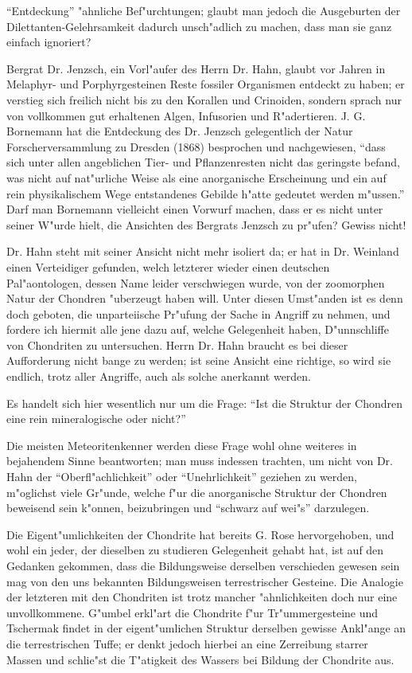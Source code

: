 \documentclass[a4paper, 12pt, oneside]{article}
\begin{document}
"`Entdeckung"' "ahnliche Bef"urchtungen; glaubt man jedoch die Ausgeburten der Dilettanten-Gelehrsamkeit dadurch unsch"adlich zu machen, dass man sie ganz einfach ignoriert?

Bergrat Dr. Jenzsch, ein Vorl"aufer des Herrn Dr. Hahn, glaubt vor Jahren in Melaphyr- und Porphyrgesteinen Reste fossiler Organismen entdeckt zu haben; er verstieg sich freilich nicht bis zu den Korallen und Crinoiden, sondern sprach nur von vollkommen gut erhaltenen Algen, Infusorien und R"adertieren. J. G. Bornemann hat die Entdeckung des Dr. Jenzsch gelegentlich der Natur Forscherversammlung zu Dresden (1868) besprochen und nachgewiesen, "`dass sich unter allen angeblichen Tier- und Pflanzenresten nicht das geringste befand, was nicht auf nat"urliche Weise als eine anorganische Erscheinung und ein auf rein physikalischem Wege entstandenes Gebilde h"atte gedeutet werden m"ussen."' Darf man Bornemann vielleicht einen Vorwurf machen, dass er es nicht unter seiner W"urde hielt, die Ansichten des Bergrats Jenzsch zu pr"ufen? Gewiss nicht!

Dr. Hahn steht mit seiner Ansicht nicht mehr isoliert da; er hat in Dr. Weinland einen Verteidiger gefunden, welch letzterer wieder einen deutschen Pal"aontologen, dessen Name leider verschwiegen wurde, von der zoomorphen Natur der Chondren "uberzeugt haben will. Unter diesen Umst"anden ist es denn doch geboten, die unparteiische Pr"ufung der Sache in Angriff zu nehmen, und fordere ich hiermit alle jene dazu auf, welche Gelegenheit haben, D"unnschliffe von Chondriten zu untersuchen. Herrn Dr. Hahn braucht es bei dieser Aufforderung nicht bange zu werden; ist seine Ansicht eine richtige, so wird sie endlich, trotz aller Angriffe, auch als solche anerkannt werden.

Es handelt sich hier wesentlich nur um die Frage: "`Ist die Struktur der Chondren eine rein mineralogische oder nicht?"'

Die meisten Meteoritenkenner werden diese Frage wohl ohne weiteres in bejahendem Sinne beantworten; man muss indessen trachten, um nicht von Dr. Hahn der "`Oberfl"achlichkeit"' oder "`Unehrlichkeit"' geziehen zu werden, m"oglichst viele Gr"unde, welche f"ur die anorganische Struktur der Chondren beweisend sein k"onnen, beizubringen und "`schwarz auf wei"s"' darzulegen.

Die Eigent"umlichkeiten der Chondrite hat bereits G. Rose hervorgehoben, und wohl ein jeder, der dieselben zu studieren Gelegenheit gehabt hat, ist auf den Gedanken gekommen, dass die Bildungsweise derselben verschieden gewesen sein mag von den uns bekannten Bildungsweisen terrestrischer Gesteine. Die Analogie der letzteren mit den Chondriten ist trotz mancher "ahnlichkeiten doch nur eine unvollkommene. G"umbel erkl"art die Chondrite f"ur Tr"ummergesteine und Tschermak findet in der eigent"umlichen Struktur derselben gewisse Ankl"ange an die terrestrischen Tuffe; er denkt jedoch hierbei an eine Zerreibung starrer Massen und schlie"st die T"atigkeit des Wassers bei Bildung der Chondrite aus.
\end{document}
